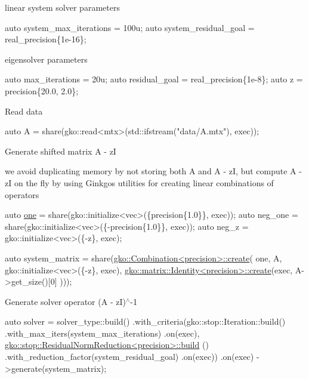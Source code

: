 linear system solver parameters


\begin{DoxyCode}
\textcolor{keyword}{auto} system\_max\_iterations = 100u;
\textcolor{keyword}{auto} system\_residual\_goal = real\_precision\{1e-16\};
\end{DoxyCode}


eigensolver parameters


\begin{DoxyCode}
\textcolor{keyword}{auto} max\_iterations = 20u;
\textcolor{keyword}{auto} residual\_goal = real\_precision\{1e-8\};
\textcolor{keyword}{auto} z = precision\{20.0, 2.0\};
\end{DoxyCode}


Read data


\begin{DoxyCode}
\textcolor{keyword}{auto} A = share(gko::read<mtx>(std::ifstream(\textcolor{stringliteral}{"data/A.mtx"}), exec));
\end{DoxyCode}


Generate shifted matrix A -\/ zI
\begin{DoxyItemize}
\item we avoid duplicating memory by not storing both A and A -\/ zI, but compute A -\/ zI on the fly by using Ginkgo\textquotesingle{}s utilities for creating linear combinations of operators
\end{DoxyItemize}


\begin{DoxyCode}
\textcolor{keyword}{auto} \hyperlink{namespacegko_a0059e27f8f4bc348ff65c1e60caf47c8}{one} = share(gko::initialize<vec>(\{precision\{1.0\}\}, exec));
\textcolor{keyword}{auto} neg\_one = share(gko::initialize<vec>(\{-precision\{1.0\}\}, exec));
\textcolor{keyword}{auto} neg\_z = gko::initialize<vec>(\{-z\}, exec);

\textcolor{keyword}{auto} system\_matrix = share(\hyperlink{classgko_1_1Combination}{gko::Combination<precision>::create}(
    one, A, gko::initialize<vec>(\{-z\}, exec),
    \hyperlink{classgko_1_1matrix_1_1Identity}{gko::matrix::Identity<precision>::create}(exec, A->get\_size()[0]
      )));
\end{DoxyCode}


Generate solver operator (A -\/ zI)$^\wedge$-\/1


\begin{DoxyCode}
\textcolor{keyword}{auto} solver =
    solver\_type::build()
        .with\_criteria(gko::stop::Iteration::build()
                           .with\_max\_iters(system\_max\_iterations)
                           .on(exec),
                       \hyperlink{classgko_1_1stop_1_1ResidualNormReduction}{gko::stop::ResidualNormReduction<precision>::build}
      ()
                           .with\_reduction\_factor(system\_residual\_goal)
                           .on(exec))
        .on(exec)
        ->generate(system\_matrix);
\end{DoxyCode}


